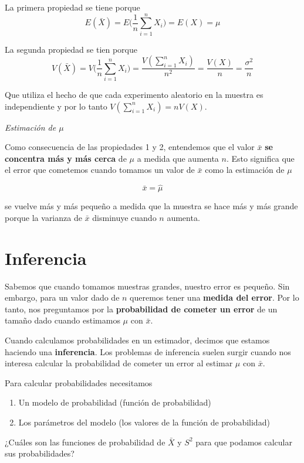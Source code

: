 \documentclass[
]{book}
\begin{document}
La primera propiedad se tiene porque
\[E(\bar{X})=E\big(\frac{1}{n}\sum_{i=1}^n X_i\big)=E(X)=\mu\]

La segunda propiedad se tien porque
\[V(\bar{X})=V\big(\frac{1}{n}\sum_{i=1}^n X_i\big)=\frac{V(\sum_{i=1}^ nX_i)}{n^2}=\frac{V(X)}{n}=\frac{\sigma^2}{n}\]

Que utiliza el hecho de que cada experimento aleatorio en la muestra es independiente y por lo tanto \(V(\sum_{i=1}^n X_i)=nV(X)\).

\emph{Estimación de \(\mu\)}

Como consecuencia de las propiedades 1 y 2, entendemos que el valor \(\bar{x}\) \textbf{se concentra más y más cerca} de \(\mu\) a medida que aumenta \(n\). Esto significa que el error que cometemos cuando tomamos un valor de \(\bar{x}\) como la estimación de \(\mu\)

\[\bar{x}=\hat{\mu}\]

se vuelve más y más pequeño a medida que la muestra se hace más y más grande porque la varianza de \(\bar{x}\) disminuye cuando \(n\) aumenta.

\hypertarget{inferencia}{%
\section{Inferencia}\label{inferencia}}

Sabemos que cuando tomamos muestras grandes, nuestro error es pequeño. Sin embargo, para un valor dado de \(n\) queremos tener una \textbf{medida del error}. Por lo tanto, nos preguntamos por la \textbf{probabilidad de cometer un error} de un tamaño dado cuando estimamos \(\mu\) con \(\bar{x}\).

Cuando calculamos probabilidades en un estimador, decimos que estamos haciendo una \textbf{inferencia}. Los problemas de inferencia suelen surgir cuando nos interesa calcular la probabilidad de cometer un error al estimar \(\mu\) con \(\bar{x}\).

Para calcular probabilidades necesitamos

\begin{enumerate}
\def\labelenumi{\arabic{enumi}.}
\item
  Un modelo de probabilidad (función de probabilidad)
\item
  Los parámetros del modelo (los valores de la función de probabilidad)
\end{enumerate}

¿Cuáles son las funciones de probabilidad de \(\bar{X}\) y \(S^2\) para que podamos calcular sus probabilidades?
\end{document}
